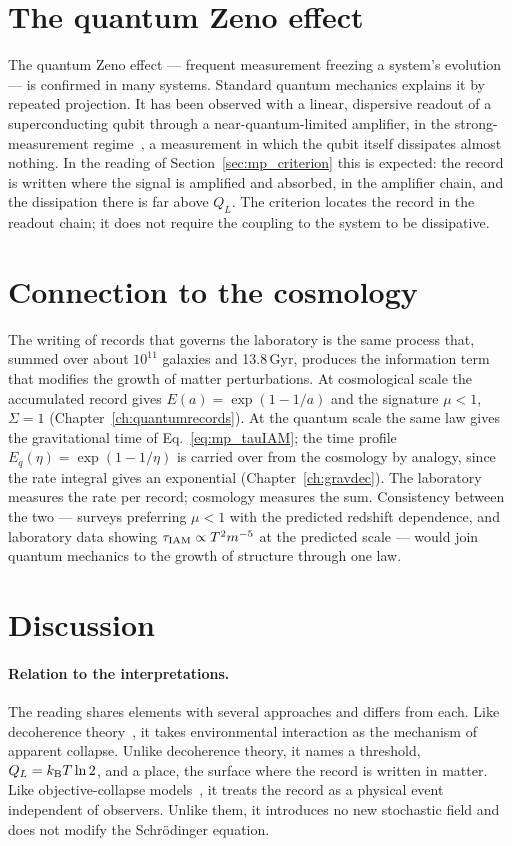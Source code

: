 \section{The quantum Zeno effect}\label{sec:mp_zeno}
The quantum Zeno effect --- frequent measurement freezing a system's evolution~\cite{Itano1990} --- is confirmed in many systems. Standard quantum
mechanics explains it by repeated projection. It has been observed with a linear, dispersive readout of a superconducting qubit through a
near-quantum-limited amplifier, in the strong-measurement regime~\cite{Slichter2016}, a measurement in which the qubit itself dissipates almost nothing. \observed{} In the reading of
Section~\ref{sec:mp_criterion} this is expected: the record is written where the signal is amplified and absorbed, in the amplifier chain, and the
dissipation there is far above $Q_L$. The criterion locates the record in the readout chain; it does not require the coupling to the system to be
dissipative. \interp

\section{Connection to the cosmology}\label{sec:mp_cosmo}
The writing of records that governs the laboratory is the same process that, summed over about $10^{11}$ galaxies and 13.8\,Gyr, produces the
information term that modifies the growth of matter perturbations. At cosmological scale the accumulated record gives $E(a)=\exp(1-1/a)$ and the
signature $\mu<1$, $\Sigma=1$ (Chapter~\ref{ch:quantumrecords}). \interp{} At the quantum scale the same law gives the gravitational time of
Eq.~\eqref{eq:mp_tauIAM}; the time profile $E_q(\eta)=\exp(1-1/\eta)$ is carried over from the cosmology by analogy, since the rate integral gives an
exponential (Chapter~\ref{ch:gravdec}). \conjecture{} The laboratory measures the rate per record; cosmology measures the sum. Consistency between the
two --- surveys preferring $\mu<1$ with the predicted redshift dependence, and laboratory data showing $\tau_{\rm IAM}\propto T^2m^{-5}$ at the predicted
scale --- would join quantum mechanics to the growth of structure through one law. \prediction

\section{Discussion}\label{sec:mp_discussion}
\paragraph{Relation to the interpretations.} The reading shares elements with several approaches and differs from each. Like decoherence
theory~\cite{Zurek2003}, it takes environmental interaction as the mechanism of apparent collapse. Unlike decoherence theory, it names a threshold,
$Q_L=k_{\mathrm B} T\ln2$, and a place, the surface where the record is written in matter. Like objective-collapse models~\cite{Penrose1996,Diosi1987}, it treats
the record as a physical event independent of observers. Unlike them, it introduces no new stochastic field and does not modify the Schr\"odinger
equation. \interp

